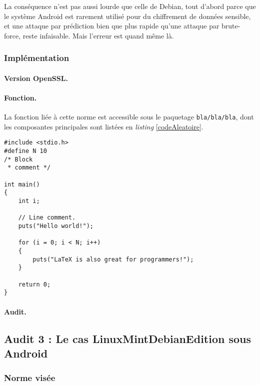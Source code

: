 		La conséquence n'est pas aussi lourde que celle de Debian, tout d'abord 
		parce que le système Android est rarement utilisé pour du 
		chiffrement de données sensible, et une attaque par prédiction bien que
		plus rapide qu'une attaque par brute-force, reste infaisable. 
		Mais l'erreur est quand même là. \\

	
	\subsubsection{Implémentation}
		
		\paragraph{Version OpenSSL.\\}
		
		\paragraph{Fonction.\\}
		La fonction liée à cette norme est accessible sous le paquetage \texttt{bla/bla/bla}, dont les composantes principales sont listées en \textit{listing} \ref{codeAleatoire}.
		
		
		\begin{lstlisting}[style=customc,caption=codeAleatoire.c, label=codeAleatoire]
#include <stdio.h>
#define N 10
/* Block
 * comment */
 
int main()
{
    int i;
 
    // Line comment.
    puts("Hello world!");
 
    for (i = 0; i < N; i++)
    {
        puts("LaTeX is also great for programmers!");
    }
 
    return 0;
}
		\end{lstlisting}
		
		
		
		\paragraph{Audit.\\}

	\subsection{Audit 3 : Le cas LinuxMintDebianEdition sous Android}
	\subsubsection{Norme visée}
